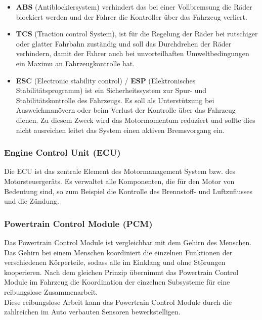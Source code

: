         \begin{itemize}
            \item \textbf{ABS} (Antiblockiersystem) verhindert das bei einer Vollbremsung die Räder
            blockiert werden und der Fahrer die Kontroller über das Fahrzeug verliert.

            \item \textbf{TCS} (Traction control System), ist für die Regelung der Räder bei rutschiger oder glatter Fahrbahn zuständig
            und soll das Durchdrehen der Räder verhindern, damit der Fahrer auch bei unvorteilhaften Umweltbedingungen ein
            Maximu an Fahrzeugkontrolle hat.

            \item \textbf{ESC} (Electronic stability control) / \textbf{ESP} (Elektronisches Stabilitätsprogramm)
            ist ein Sicherheitssystem zur Spur- und Stabilitätskontrolle des Fahrzeugs.
            Es soll als Unterstützung bei Ausweichmanövern oder beim Verlust der Kontrolle über das Fahrzeug dienen. 
            Zu diesem Zweck wird das Motormomentum reduziert und sollte dies nicht ausreichen leitet das System einen aktiven
            Bremsvorgang ein.
        \end{itemize}

        \subsubsection{Engine Control Unit (ECU)}
        Die ECU ist das zentrale Element des Motormanagement System bzw. des Motorsteuergeräts. Es verwaltet alle
        Komponenten, die für den Motor von Bedeutung sind, so zum Beispiel die Kontrolle des Brennstoff- und Luftzuflusses und die Zündung. 

        \subsubsection{Powertrain Control Module (PCM)}
        Das Powertrain Control Module ist vergleichbar mit dem Gehirn des Menschen. Das Gehirn bei einem Menschen
        koordiniert die einzelnen Funktionen der verschiedenen Körperteile, sodass alle im Einklang und ohne
        Störungen kooperieren. Nach dem gleichen Prinzip übernimmt das Powertrain Control Module im Fahrzeug die Koordination der einzelnen
        Subsysteme für eine reibungslose Zusammenarbeit.\\ Diese reibungslose Arbeit kann das Powertrain
        Control Module durch die zahlreichen im Auto verbauten Sensoren bewerkstelligen.

